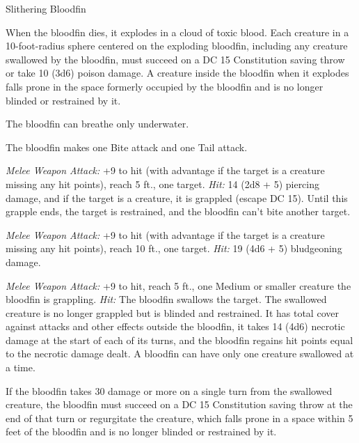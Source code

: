 \documentclass[10pt,a4paper,twoside,bg=none,twocolumn,openany,nodeprecatedcode]{dndbook}
\begin{document}
\begin{DndMonster}[float=t]{Slithering Bloodfin}
\DndMonsterBasics[
armor-class = {16 (natural armor)},
hit-points = {\DndDice{11d10 + 33}},
speed = {5 ft., swim 50 ft.}
]
\DndMonsterAbilityScores[
 str = 20,
 dex = 14,
 con = 16,
 int = 2,
 wis = 10,
 cha = 3
]
\DndMonsterDetails[
skills = {Perception +4},
damage-immunities = {poison},
senses = {blindsight 100 ft. (blind beyond this radius), passive perception 14},
challenge = 9,
]
When the bloodfin dies, it explodes in a cloud of toxic blood. Each creature in a 10-foot-radius sphere centered on the exploding bloodfin, including any creature swallowed by the bloodfin, must succeed on a DC 15 Constitution saving throw or take 10 (3d6) poison damage. A creature inside the bloodfin when it explodes falls prone in the space formerly occupied by the bloodfin and is no longer blinded or restrained by it.

The bloodfin can breathe only underwater.

\par
{}
The bloodfin makes one Bite attack and one Tail attack.

\textsl{Melee Weapon Attack:} +9 to hit (with advantage if the target is a creature missing any hit points), reach 5 ft., one target. \textsl{Hit:} 14 (2d8 + 5) piercing damage, and if the target is a creature, it is grappled (escape DC 15). Until this grapple ends, the target is restrained, and the bloodfin can't bite another target.

\textsl{Melee Weapon Attack:} +9 to hit (with advantage if the target is a creature missing any hit points), reach 10 ft., one target. \textsl{Hit:} 19 (4d6 + 5) bludgeoning damage.

\par
{}
\textsl{Melee Weapon Attack:} +9 to hit, reach 5 ft., one Medium or smaller creature the bloodfin is grappling. \textsl{Hit:} The bloodfin swallows the target. The swallowed creature is no longer grappled but is blinded and restrained. It has total cover against attacks and other effects outside the bloodfin, it takes 14 (4d6) necrotic damage at the start of each of its turns, and the bloodfin regains hit points equal to the necrotic damage dealt. A bloodfin can have only one creature swallowed at a time.

If the bloodfin takes 30 damage or more on a single turn from the swallowed creature, the bloodfin must succeed on a DC 15 Constitution saving throw at the end of that turn or regurgitate the creature, which falls prone in a space within 5 feet of the bloodfin and is no longer blinded or restrained by it.

\end{DndMonster}
\end{document}
